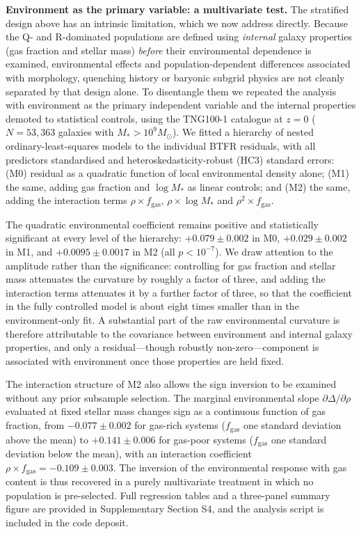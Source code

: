 \documentclass[11pt,a4paper]{article}
\begin{document}
\textbf{Environment as the primary variable: a multivariate test.} The stratified design above has an intrinsic limitation, which we now address directly. Because the Q- and R-dominated populations are defined using \textit{internal} galaxy properties (gas fraction and stellar mass) \textit{before} their environmental dependence is examined, environmental effects and population-dependent differences associated with morphology, quenching history or baryonic subgrid physics are not cleanly separated by that design alone. To disentangle them we repeated the analysis with environment as the primary independent variable and the internal properties demoted to statistical controls, using the TNG100-1 catalogue at $z=0$ ($N = 53{,}363$ galaxies with $M_* > 10^9 M_\odot$). We fitted a hierarchy of nested ordinary-least-squares models to the individual BTFR residuals, with all predictors standardised and heteroskedasticity-robust (HC3) standard errors: (M0) residual as a quadratic function of local environmental density alone; (M1) the same, adding gas fraction and $\log M_*$ as linear controls; and (M2) the same, adding the interaction terms $\rho \times f_{\mathrm{gas}}$, $\rho \times \log M_*$ and $\rho^2 \times f_{\mathrm{gas}}$.

The quadratic environmental coefficient remains positive and statistically significant at every level of the hierarchy: $+0.079 \pm 0.002$ in M0, $+0.029 \pm 0.002$ in M1, and $+0.0095 \pm 0.0017$ in M2 (all $p < 10^{-7}$). We draw attention to the amplitude rather than the significance: controlling for gas fraction and stellar mass attenuates the curvature by roughly a factor of three, and adding the interaction terms attenuates it by a further factor of three, so that the coefficient in the fully controlled model is about eight times smaller than in the environment-only fit. A substantial part of the raw environmental curvature is therefore attributable to the covariance between environment and internal galaxy properties, and only a residual---though robustly non-zero---component is associated with environment once those properties are held fixed.

The interaction structure of M2 also allows the sign inversion to be examined without any prior subsample selection. The marginal environmental slope $\partial \Delta / \partial \rho$ evaluated at fixed stellar mass changes sign as a continuous function of gas fraction, from $-0.077 \pm 0.002$ for gas-rich systems ($f_{\mathrm{gas}}$ one standard deviation above the mean) to $+0.141 \pm 0.006$ for gas-poor systems ($f_{\mathrm{gas}}$ one standard deviation below the mean), with an interaction coefficient $\rho \times f_{\mathrm{gas}} = -0.109 \pm 0.003$. The inversion of the environmental response with gas content is thus recovered in a purely multivariate treatment in which no population is pre-selected. Full regression tables and a three-panel summary figure are provided in Supplementary Section S4, and the analysis script is included in the code deposit.
\end{document}
